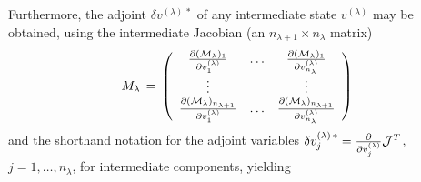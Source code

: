 %
Furthermore, the adjoint  $ \delta v^{(\lambda) \, \ast} $
of any intermediate state $ v^{(\lambda)} $
may be obtained, using the intermediate Jacobian
(an $ n_{\lambda+1} \times n_{\lambda} $ matrix)
%
\[
M_{\lambda} \, = \,
\left(
\begin{array}{ccc}
\frac{\partial ({\cal M}_{\lambda})_1}{\partial v^{(\lambda)}_1}
& \ldots &
\frac{\partial ({\cal M}_{\lambda})_1}{\partial v^{(\lambda)}_{n_{\lambda}}} \\
\vdots & ~ & \vdots \\
\frac{\partial ({\cal M}_{\lambda})_{n_{\lambda+1}}}{\partial v^{(\lambda)}_1}
& \ldots &
\frac{\partial ({\cal M}_{\lambda})_{n_{\lambda+1}}}{\partial v^{(\lambda)}_{n_{\lambda}}} \\
\end{array}
\right)
\]
%
and the shorthand notation for the adjoint variables
$ \delta v^{(\lambda) \, \ast}_{j} = \frac{\partial}{\partial v^{(\lambda)}_{j}} 
{\cal J}^T $, $ j = 1, \ldots , n_{\lambda} $, 
for intermediate components, yielding
